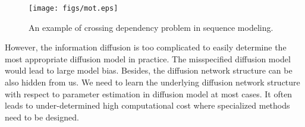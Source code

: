 
\begin{figure}[t]
\label{fig:mot}
\centering
\texttt{[image: figs/mot.eps]}
\caption{
An example of crossing dependency problem in sequence modeling. 
}
\end{figure}

However, the information diffusion is too complicated to easily determine
the most appropriate diffusion model in practice. The misspecified diffusion
model would lead to large model bias. Besides, the diffusion network structure
can be also hidden from us. We need to learn the underlying
diffusion network structure with respect to parameter estimation in diffusion
model at most cases. It often leads to under-determined high computational cost
where specialized methods need to be designed. 

